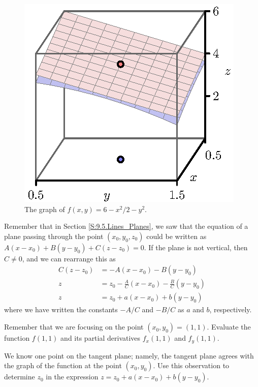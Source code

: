 \begin{pa}
  \begin{figure}[ht]
    \begin{center}
      \includegraphics{figures/fig_10_4_tangent_4.eps}
    \end{center}
    \caption{The graph of $f(x,y)=6-x^2/2 - y^2$.}
    \label{F:10.4.tangent.4}
  \end{figure}

  Remember that in Section \ref{S:9.5.Lines_Planes}, we saw that the
  equation of a plane passing through the point $(x_0, y_0, z_0)$
  could be written as $A(x-x_0) + B(y-y_0) + C(z-z_0) = 0$.  If the
  plane is not vertical, then $C\neq 0$, and we can
  rearrange this as
  \begin{align*}
    C(z-z_0) & = -A(x-x_0) - B(y-y_0) \\
    z & = z_0-\frac AC(x-x_0) - \frac BC(y-y_0) \\
    z & = z_0 + a(x-x_0) + b(y-y_0)
  \end{align*}
  where we have written the constants $-A/C$ and $-B/C$ as $a$ and
  $b$, respectively.
    
\ba
\item Remember that we are focusing on the point $(x_0,y_0) = (1,1)$.
  Evaluate the function $f(1,1)$ and its partial derivatives
  $f_x(1,1)$ and $f_y(1,1)$.

\item We know one point on the tangent plane;  namely, the tangent
  plane agrees with the graph of the function at the point $(x_0,
  y_0)$.  Use this observation to determine $z_0$ in the expression
  $z = z_0 + a(x-x_0) + b(y-y_0)$.


\end{pa}
